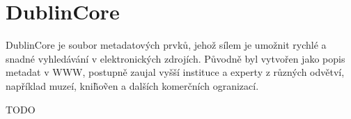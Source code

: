 \section{DublinCore}
\par DublinCore je soubor metadatových prvků, jehož sílem je umožnit rychlé a snadné vyhledávání v elektronických zdrojích. Původně byl vytvořen jako popis metadat v WWW, postupně zaujal vyšší instituce a experty z různých odvětví, například muzeí, kni\~ho\~ven a dalších komerčních ogranizací.
\par TODO
 
%
%
%
%
%
%
%
